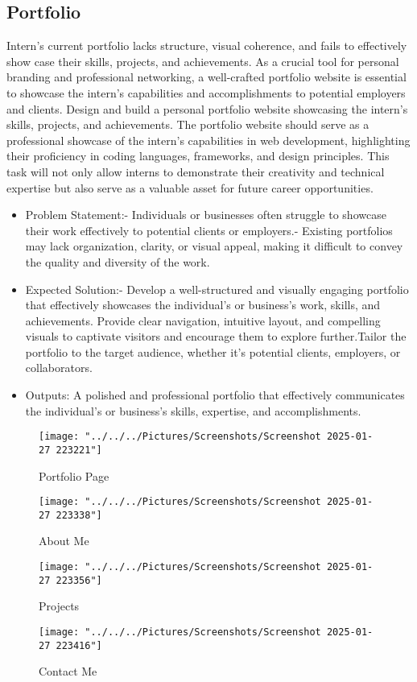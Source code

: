 \subsection*{Portfolio} Intern’s current portfolio lacks structure, visual coherence, and fails to effectively show
case their skills, projects, and achievements. As a crucial tool for personal branding and professional networking, a well-crafted portfolio website is essential to showcase the intern’s capabilities and accomplishments to potential employers and clients. Design and build a personal portfolio website showcasing the intern’s skills, projects, and achievements. The portfolio website should serve as a professional showcase of the intern’s capabilities in web development, highlighting their proficiency in coding languages, frameworks, and design principles. This task will not only allow interns to demonstrate their creativity and technical expertise but also serve as a valuable asset for future career opportunities.
\begin{itemize}
\item Problem Statement:- Individuals or businesses often struggle to showcase their work effectively to potential clients or employers.- Existing portfolios may lack organization, clarity, or visual appeal, making it difficult to convey the quality and diversity of the work.
\item  Expected Solution:- Develop a well-structured and visually engaging portfolio that effectively showcases the individual’s or business’s work, skills, and achievements. Provide clear navigation, intuitive layout, and compelling visuals to captivate visitors and encourage them to explore further.Tailor the portfolio to the target audience, whether it’s potential clients, employers, or collaborators.
\item Outputs: A polished and professional portfolio that effectively communicates the individual’s or business’s skills, expertise, and accomplishments.
\end{itemize}
\newpage
\begin{figure}[tbph]
\centering	\texttt{[image: "../../../Pictures/Screenshots/Screenshot 2025-01-27 223221"]}
\caption{Portfolio Page}
\label{fig:screenshot-2025-01-27-223221}
\end{figure}
\begin{figure}[tbph]
\centering
\texttt{[image: "../../../Pictures/Screenshots/Screenshot 2025-01-27 223338"]}
\caption{About Me}
\label{fig:screenshot-2025-01-27-223338}
\end{figure}
\begin{figure}[tbph]
\centering
\hspace{-5mm}
\vspace{-10mm}
\texttt{[image: "../../../Pictures/Screenshots/Screenshot 2025-01-27 223356"]}
\caption{Projects}
\label{fig:screenshot-2025-01-27-223356}
\end{figure}
\newpage
\begin{figure}[tbph]
\centering
\texttt{[image: "../../../Pictures/Screenshots/Screenshot 2025-01-27 223416"]}
\caption{Contact Me}
\label{fig:screenshot-2025-01-27-223416}
\end{figure}
